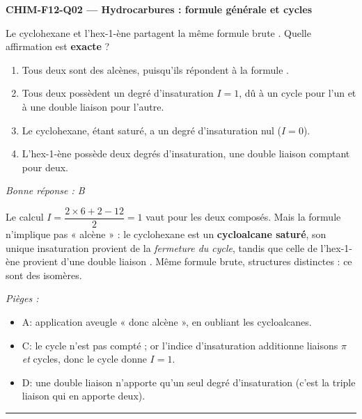 \documentclass[11pt,a4paper]{article}
\begin{document}
\noindent\textbf{CHIM-F12-Q02 --- Hydrocarbures : formule générale et cycles}\par
Le cyclohexane et l'hex-1-ène partagent la même formule brute . Quelle affirmation est \textbf{exacte} ?
\begin{enumerate}[label=\Alph*)]
\item Tous deux sont des alcènes, puisqu'ils répondent à la formule .
\item Tous deux possèdent un degré d'insaturation $I=1$, dû à un cycle pour l'un et à une double liaison  pour l'autre.
\item Le cyclohexane, étant saturé, a un degré d'insaturation nul ($I=0$).
\item L'hex-1-ène possède deux degrés d'insaturation, une double liaison comptant pour deux.
\end{enumerate}
\textit{Bonne réponse : B}\par
Le calcul $I=\dfrac{2\times6+2-12}{2}=1$ vaut pour les deux composés. Mais la formule  n'implique pas « alcène » : le cyclohexane est un \textbf{cycloalcane saturé}, son unique insaturation provient de la \emph{fermeture du cycle}, tandis que celle de l'hex-1-ène provient d'une double liaison . Même formule brute, structures distinctes : ce sont des isomères.\par
\textit{Pièges :}
\begin{itemize}
\item A: application aveugle «  donc alcène », en oubliant les cycloalcanes.
\item C: le cycle n'est pas compté ; or l'indice d'insaturation additionne liaisons $\pi$ \emph{et} cycles, donc le cycle donne $I=1$.
\item D: une double liaison  n'apporte qu'un seul degré d'insaturation (c'est la triple liaison qui en apporte deux).
\end{itemize}
\vspace{8pt}\hrule\vspace{8pt}
\end{document}
